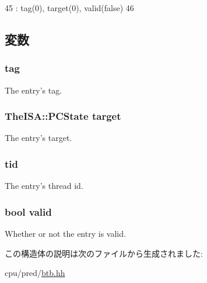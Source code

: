 \begin{DoxyCode}
45             : tag(0), target(0), valid(false)
46         {}
\end{DoxyCode}


\subsection{変数}
\hypertarget{structDefaultBTB_1_1BTBEntry_a37fe97093e3df5a68f35c18538628836}{
\subsubsection[{tag}]{ {\bf tag}}}
\label{structDefaultBTB_1_1BTBEntry_a37fe97093e3df5a68f35c18538628836}
The entry's tag. \hypertarget{structDefaultBTB_1_1BTBEntry_a66d4c02793d74240a0ebca6531d38c26}{
\subsubsection[{target}]{\setlength{\rightskip}{0pt plus 5cm}TheISA::PCState {\bf target}}}
\label{structDefaultBTB_1_1BTBEntry_a66d4c02793d74240a0ebca6531d38c26}
The entry's target. \hypertarget{structDefaultBTB_1_1BTBEntry_aa508770268ee4ceaf16054b9e0be0e17}{
\subsubsection[{tid}]{ {\bf tid}}}
\label{structDefaultBTB_1_1BTBEntry_aa508770268ee4ceaf16054b9e0be0e17}
The entry's thread id. \hypertarget{structDefaultBTB_1_1BTBEntry_a28e3c179a86f337095088b3ca02a2b2a}{
\subsubsection[{valid}]{\setlength{\rightskip}{0pt plus 5cm}bool {\bf valid}}}
\label{structDefaultBTB_1_1BTBEntry_a28e3c179a86f337095088b3ca02a2b2a}
Whether or not the entry is valid. 

この構造体の説明は次のファイルから生成されました:\begin{DoxyCompactItemize}
\item 
cpu/pred/\hyperlink{btb_8hh}{btb.hh}\end{DoxyCompactItemize}
